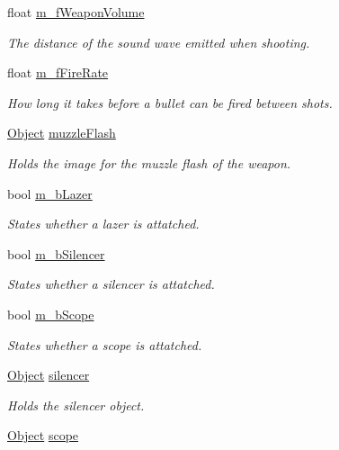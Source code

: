 \begin{DoxyCompactItemize}
float \hyperlink{class_weapon_a1b91345de3c92a8862221736b58834ab}{m\+\_\+f\+Weapon\+Volume}
\begin{DoxyCompactList}\small\item\em The distance of the sound wave emitted when shooting. \end{DoxyCompactList}\item 
float \hyperlink{class_weapon_a267de698f7c9b12cdcdea18fc4a286ef}{m\+\_\+f\+Fire\+Rate}
\begin{DoxyCompactList}\small\item\em How long it takes before a bullet can be fired between shots. \end{DoxyCompactList}\item 
\hyperlink{class_object}{Object} \hyperlink{class_weapon_a45c4ba5371558dd1245b989c5c26c962}{muzzle\+Flash}
\begin{DoxyCompactList}\small\item\em Holds the image for the muzzle flash of the weapon. \end{DoxyCompactList}\item 
bool \hyperlink{class_weapon_ade3b08884072f3fa5c8bb5ba242198e1}{m\+\_\+b\+Lazer}
\begin{DoxyCompactList}\small\item\em States whether a lazer is attatched. \end{DoxyCompactList}\item 
bool \hyperlink{class_weapon_a4e9d216d4b896d0c1afa75f32184b787}{m\+\_\+b\+Silencer}
\begin{DoxyCompactList}\small\item\em States whether a silencer is attatched. \end{DoxyCompactList}\item 
bool \hyperlink{class_weapon_aee688b1d8e2421eefc861089a36ceac4}{m\+\_\+b\+Scope}
\begin{DoxyCompactList}\small\item\em States whether a scope is attatched. \end{DoxyCompactList}\item 
\hyperlink{class_object}{Object} \hyperlink{class_weapon_a78d092409afe65e44563870eef37d158}{silencer}
\begin{DoxyCompactList}\small\item\em Holds the silencer object. \end{DoxyCompactList}\item 
\hyperlink{class_object}{Object} \hyperlink{class_weapon_aac79adb9764ea4f9b009d93d85acebad}{scope}

\end{DoxyCompactItemize}
